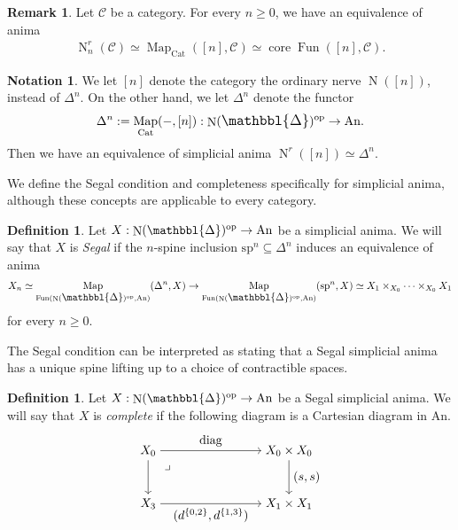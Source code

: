\documentclass[a4paper,dvipdfmx,11pt,reqno]{amsart}
\DeclareMathOperator{\Map}{Map}
\DeclareMathOperator{\myop}{op}
\DeclareMathOperator{\N}{N}
\DeclareMathOperator{\Fun}{Fun}
\newcommand{\C}{\mathcal{C}}
\DeclareMathOperator{\core}{core}
\newcommand{\An}{\mathrm{An}}
\newcommand{\Cat}{\mathrm{Cat}}
\newcommand{\prism}{{\mathlarger{\mathbbl{\Delta}}}}
\theoremstyle{definition}
\newtheorem{definition}[theorem]{Definition}
\newtheorem{notation}[theorem]{Notation}
\newtheorem{remark}[theorem]{Remark}
\begin{document}
\begin{remark}
  Let $\C$ be a category.
  For every $n \geq 0$, we have an equivalence of anima
  \begin{align*}
    \N^r_n(\C) \simeq \Map_{\Cat}([n],\C) \simeq \core\Fun([n],\C).
  \end{align*}
\end{remark}

\begin{notation}
  We let $[n]$ denote the category the ordinary nerve $\N([n])$, instead of $\Delta^n$.
  On the other hand, we let $\Delta^n$ denote the functor 
  \begin{align*}
    \Delta^n := \Map_{\Cat}(-,[n]) : \N(\prism)^{\myop} \to \An.
  \end{align*}
  Then we have an equivalence of simplicial anima $\N^r([n]) \simeq \Delta^n$.
\end{notation}

We define the Segal condition and completeness specifically for simplicial anima, although these concepts are applicable to every category.

\begin{definition}
  Let $X : \N(\prism)^{\myop} \to \An$ be a simplicial anima.
  We will say that $X$ is \textit{Segal} if the $n$-spine inclusion $\mathrm{sp}^n \subseteq \Delta^n$ induces an equivalence of anima 
  \begin{align*}
    X_n \simeq \Map_{\Fun(\N(\prism)^{\myop},\An)}(\Delta^n,X) \to \Map_{\Fun(\N(\prism)^{\myop},\An)}(\mathrm{sp}^n,X) \simeq X_1 \times_{X_0} \cdots \times_{X_0} X_1
  \end{align*}
  for every $n \geq 0$.
\end{definition}

The Segal condition can be interpreted as stating that a Segal simplicial anima has a unique spine lifting up to a choice of contractible spaces.

\begin{definition}
  Let $X : \N(\prism)^{\myop} \to \An$ be a Segal simplicial anima.
  We will say that $X$ is \textit{complete} if the following diagram is a Cartesian diagram in $\An$.
  \[\begin{tikzpicture}[auto,->] 
    \node (tl) at (0,1.5) {$X_0$}; 
    \node (tr) at (4,1.5) {$X_0 \times X_0$};
    \node (bl) at (0,0) {$X_3$}; 
    \node (br) at (4,0) {$X_1 \times X_1$}; 
    \draw (tl) -- node {$\mathrm{diag}$} (tr); 
    \draw (bl) -- node[swap] {$(d^{\{0,2\}},d^{\{1,3\}})$} (br); 
    \draw (tl) -- node[swap] {} (bl);
    \draw (tr) -- node {$(s,s)$} (br); 
    \node at ([xshift=0.2cm, yshift=-0.2cm] tl.south east) {$\lrcorner$};
  \end{tikzpicture}\]
\end{definition}
\end{document}
